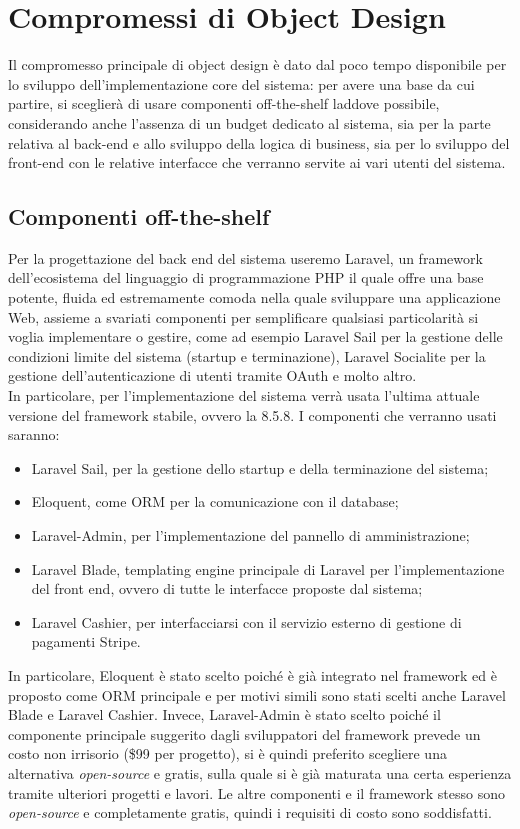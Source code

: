 \section{Compromessi di Object Design}
Il compromesso principale di object design è dato dal poco tempo disponibile per lo sviluppo dell’implementazione core del sistema: per avere una base da cui partire, si sceglierà di usare componenti off-the-shelf laddove possibile, considerando anche l’assenza di un budget dedicato al sistema, sia per la parte relativa al back-end e allo sviluppo della logica di business, sia per lo sviluppo del front-end con le relative interfacce che verranno servite ai vari utenti del sistema.

\subsection{Componenti off-the-shelf}
Per la progettazione del back end del sistema useremo Laravel, un framework dell’ecosistema del linguaggio di programmazione PHP il quale offre una base potente, fluida ed estremamente comoda nella quale sviluppare una applicazione Web, assieme a svariati componenti per semplificare qualsiasi particolarità si voglia implementare o gestire, come ad esempio Laravel Sail per la gestione delle condizioni limite del sistema (startup e terminazione), Laravel Socialite per la gestione dell’autenticazione di utenti tramite OAuth e molto altro. \\
In particolare, per l’implementazione del sistema verrà usata l’ultima attuale versione del framework stabile, ovvero la 8.5.8. I componenti che verranno usati saranno:

\begin{itemize}
	\item Laravel Sail, per la gestione dello startup e della terminazione del sistema;
	\item Eloquent, come ORM per la comunicazione con il database;
	\item Laravel-Admin, per l’implementazione del pannello di amministrazione;
	\item Laravel Blade, templating engine principale di Laravel per l’implementazione del front end, ovvero di tutte le interfacce proposte dal sistema;
	\item Laravel Cashier, per interfacciarsi con il servizio esterno di gestione di pagamenti Stripe.
\end{itemize}

In particolare, Eloquent è stato scelto poiché è già integrato nel framework ed è proposto come ORM principale e per motivi simili sono stati scelti anche Laravel Blade e Laravel Cashier. Invece, Laravel-Admin è stato scelto poiché il componente principale suggerito dagli sviluppatori del framework prevede un costo non irrisorio (\$99 per progetto), si è quindi preferito scegliere una alternativa \emph{open-source} e gratis, sulla quale si è già maturata una certa esperienza tramite ulteriori progetti e lavori. Le altre componenti e il framework stesso sono \emph{open-source} e completamente gratis, quindi i requisiti di costo sono soddisfatti.

